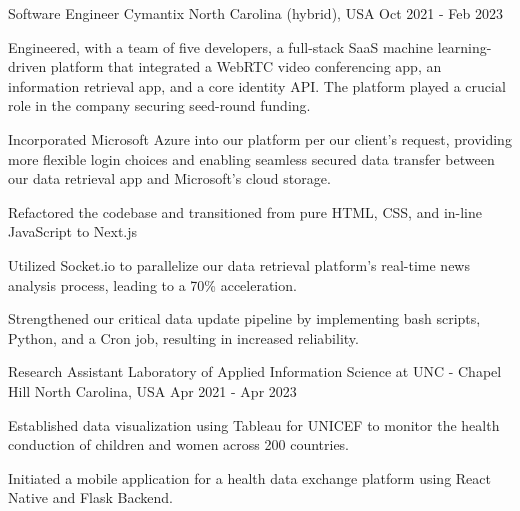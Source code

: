 \begin{cventries}
    \cventry
    {Software Engineer} %
    {Cymantix} %
    {North Carolina (hybrid), USA} %
    {Oct 2021 - Feb 2023} %
    {
      \begin{cvitems} %
        \item {Engineered, with a team of five developers,  a full-stack SaaS machine learning-driven platform that integrated a WebRTC video conferencing app, an information retrieval app, and a core identity API. The platform played a crucial role in the company securing seed-round funding.}
        \item {Incorporated Microsoft Azure into our platform per our client's request, providing more flexible login choices and enabling seamless secured data transfer between our data retrieval app and Microsoft's cloud storage.}
        \item {Refactored the codebase and transitioned from pure HTML, CSS, and in-line JavaScript to Next.js}
        \item {Utilized Socket.io to parallelize our data retrieval platform's real-time news analysis process, leading to a 70\% acceleration.}
        \item {Strengthened our critical data update pipeline by implementing bash scripts, Python, and a Cron job, resulting in increased reliability.}
      \end{cvitems}
    }

    \cventry
    {Research Assistant} %
    {Laboratory of Applied Information Science at UNC - Chapel Hill} %
    {North Carolina, USA} %
    {Apr 2021 - Apr 2023} %
    {
      \begin{cvitems} %
        \item {Established data visualization using Tableau for UNICEF to monitor the health conduction of children and women across 200 countries.}
        \item {Initiated a mobile application for a health data exchange platform using React Native and Flask Backend.}
      \end{cvitems}
    }


\end{cventries}
